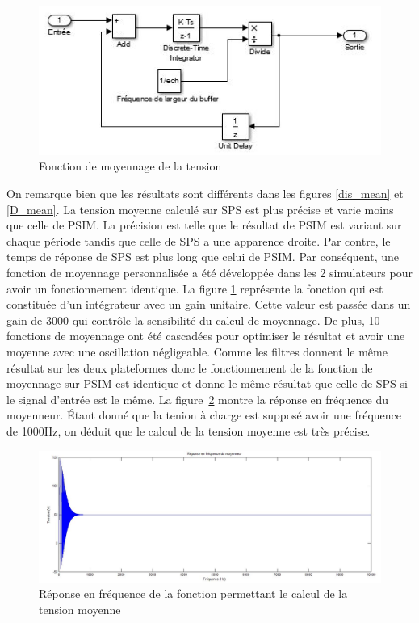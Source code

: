 \documentclass[11pt,letterpaper,final]{report}
\begin{document}
\begin{figure}[ht]
\centering
\includegraphics[scale=0.8]{fig/moy.jpg}
\caption{Fonction de moyennage de la tension}
\label{moy}
\end{figure}
On remarque bien que les résultats sont différents dans les figures \ref{dis_mean} et \ref{D_mean}. La tension moyenne calculé sur SPS est plus précise et varie moins que celle de PSIM. La précision est telle que le résultat de PSIM est variant sur chaque période tandis que celle de SPS a une apparence droite. Par contre, le temps de réponse de SPS est plus long que celui de PSIM. Par conséquent, une fonction de moyennage personnalisée a été développée dans les 2 simulateurs pour avoir un fonctionnement identique. La figure \ref{moy} représente la fonction qui est constituée d'un intégrateur avec un gain unitaire. Cette valeur est passée dans un gain de 3000 qui contrôle la sensibilité du calcul de moyennage. De plus, 10 fonctions de moyennage ont été cascadées pour optimiser le résultat et avoir une moyenne avec une oscillation négligeable. Comme les filtres donnent le même résultat sur les deux plateformes donc le fonctionnement de la fonction de moyennage sur PSIM est identique et donne le même résultat que celle de SPS si le signal d'entrée est le même. La figure~\ref{rep_freq_mo} montre la réponse en fréquence du moyenneur. Étant donné que la tenion à charge est supposé avoir une fréquence de 1000Hz, on déduit que le calcul de la tension moyenne est très précise.



\begin{figure}[h!]
\centering
\includegraphics[scale=0.4]{fig/rep_freq_moy.jpg}
\caption{Réponse en fréquence de la fonction permettant le calcul de la tension moyenne}
\label{rep_freq_mo}
\end{figure}
\end{document}

